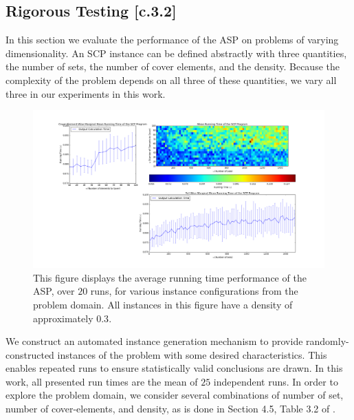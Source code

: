 \documentclass[12pt]{article}
\begin{document}
\subsection{Rigorous Testing [c.3.2]} \label{scn:testing_complete}

In this section we evaluate the performance of the ASP on problems of varying dimensionality. An SCP instance can be defined abstractly with three quantities, the number of sets, the number of cover elements, and the density. Because the complexity of the problem depends on all three of these quantities, we vary all three in our experiments in this work. 

\begin{figure}[ht!]\label{fig:runtime_analysis_density0p3}
	
	
	
	\centering
	\centerline{\includegraphics[width = 6.7in]{running_time_original_density0p3.png}}
	\hfill
	
	\caption{This figure displays the average running time performance of the ASP, over $20$ runs, for various instance configurations from the problem domain. All instances in this figure have a density of approximately $0.3$.}
	
	
\end{figure}


We construct an automated instance generation mechanism to provide randomly-constructed instances of the problem with some desired characteristics. This enables repeated runs to ensure statistically valid conclusions are drawn. In this work, all presented run times are the mean of $25$ independent runs. In order to explore the problem domain, we consider several combinations of number of set, number of cover-elements, and density, as is done in Section 4.5, Table 3.2 of \cite{graph_algorithms_cristofides}.
\end{document}
